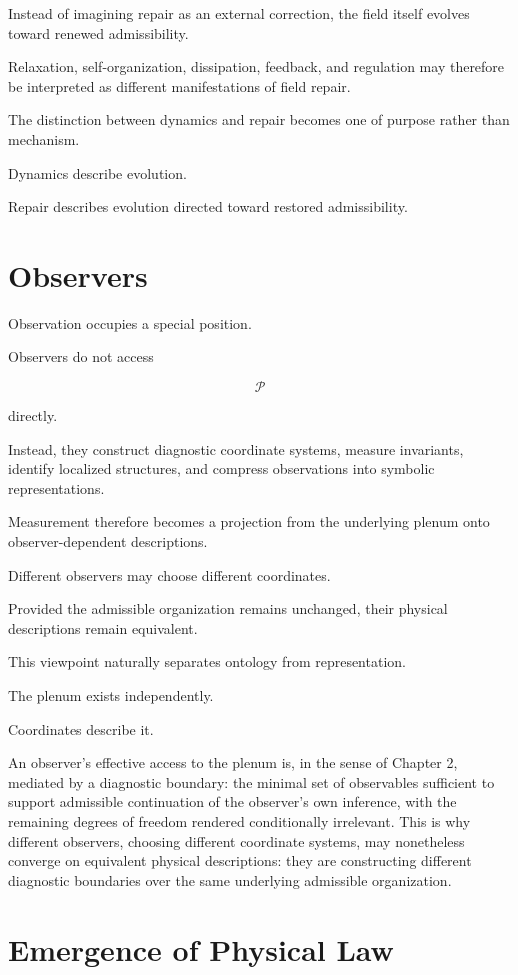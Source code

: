 \documentclass[11pt,oneside]{book}
\numberwithin{equation}{chapter}
\theoremstyle{definition}
\theoremstyle{plain}
\begin{document}
Instead of imagining repair as an external correction, the field itself
evolves toward renewed admissibility.

Relaxation, self-organization, dissipation, feedback, and regulation may
therefore be interpreted as different manifestations of field repair.

The distinction between dynamics and repair becomes one of purpose rather
than mechanism.

Dynamics describe evolution.

Repair describes evolution directed toward restored admissibility.

\section{Observers}

Observation occupies a special position.

Observers do not access

\[
\mathcal P
\]

directly.

Instead, they construct diagnostic coordinate systems, measure invariants,
identify localized structures, and compress observations into symbolic
representations.

Measurement therefore becomes a projection from the underlying plenum onto
observer-dependent descriptions.

Different observers may choose different coordinates.

Provided the admissible organization remains unchanged, their physical
descriptions remain equivalent.

This viewpoint naturally separates ontology from representation.

The plenum exists independently.

Coordinates describe it.

An observer's effective access to the plenum is, in the sense of Chapter 2,
mediated by a diagnostic boundary: the minimal set of observables sufficient
to support admissible continuation of the observer's own inference, with the
remaining degrees of freedom rendered conditionally irrelevant. This is why
different observers, choosing different coordinate systems, may nonetheless
converge on equivalent physical descriptions: they are constructing
different diagnostic boundaries over the same underlying admissible
organization.

\section{Emergence of Physical Law}
\end{document}
